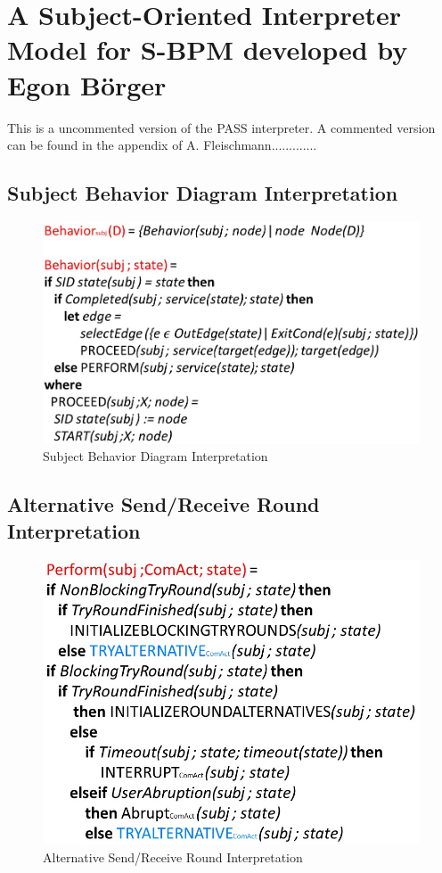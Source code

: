 \chapter{A Subject-Oriented Interpreter Model for
	S-BPM developed by Egon Börger}
\label{ASM-Interpreter}

This is a uncommented version of the PASS interpreter. A commented version can be found in the appendix of A. Fleischmann.............


\section{Subject Behavior Diagram Interpretation}

\begin{figure}[ph]
	\centering
	\includegraphics[width=0.7\linewidth]{20181026-Ontologie-Bilder/Grafiken-Ontologie/SUbjectExecution/ASM-Behavior}
	\caption[Subject Behavior Diagram Interpretation]{Subject Behavior Diagram Interpretation}
	\label{fig:asm-behavior}
\end{figure}



\section{Alternative Send/Receive Round Interpretation}

\begin{figure}[ph]
	\centering
	\includegraphics[width=0.6\linewidth]{20181026-Ontologie-Bilder/Grafiken-Ontologie/SUbjectExecution/ASM-perform}
	\caption[Alternative Send/Receive Round Interpretation]{Alternative Send/Receive Round Interpretation}
	\label{fig:asm-perform}
\end{figure}

